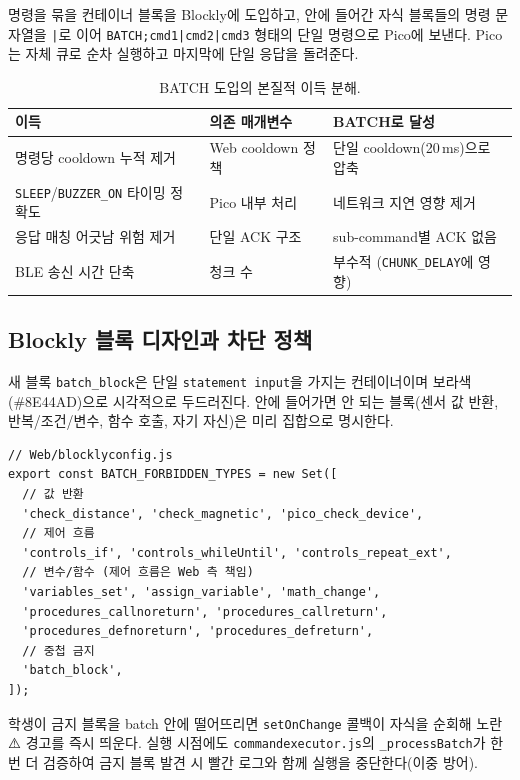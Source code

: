 \documentclass[11pt, oneside]{article}
\begin{document}
명령을 묶을 컨테이너 블록을 Blockly에 도입하고, 안에 들어간 자식 블록들의
명령 문자열을 \texttt{|}로 이어 \texttt{BATCH;cmd1|cmd2|cmd3} 형태의 단일
명령으로 Pico에 보낸다. Pico는 자체 큐로 순차 실행하고 마지막에 단일
응답을 돌려준다.

\begin{table}[h]
\centering
\small
\begin{tabularx}{\linewidth}{@{}lXX@{}}
\toprule
이득 & 의존 매개변수 & BATCH로 달성 \\
\midrule
명령당 cooldown 누적 제거 & Web cooldown 정책 & 단일 cooldown(20\,ms)으로 압축 \\
\texttt{SLEEP}/\texttt{BUZZER\_ON} 타이밍 정확도 & Pico 내부 처리 & 네트워크 지연 영향 제거 \\
응답 매칭 어긋남 위험 제거 & 단일 ACK 구조 & sub-command별 ACK 없음 \\
BLE 송신 시간 단축 & 청크 수 & 부수적 (\texttt{CHUNK\_DELAY}에 영향) \\
\bottomrule
\end{tabularx}
\caption{BATCH 도입의 본질적 이득 분해.}
\end{table}

\subsection{Blockly 블록 디자인과 차단 정책}

새 블록 \texttt{batch\_block}은 단일 \texttt{statement input}을 가지는
컨테이너이며 보라색(\#8E44AD)으로 시각적으로 두드러진다. 안에 들어가면
안 되는 블록(센서 값 반환, 반복/조건/변수, 함수 호출, 자기 자신)은
미리 집합으로 명시한다.

\begin{verbatim}
// Web/blocklyconfig.js
export const BATCH_FORBIDDEN_TYPES = new Set([
  // 값 반환
  'check_distance', 'check_magnetic', 'pico_check_device',
  // 제어 흐름
  'controls_if', 'controls_whileUntil', 'controls_repeat_ext',
  // 변수/함수 (제어 흐름은 Web 측 책임)
  'variables_set', 'assign_variable', 'math_change',
  'procedures_callnoreturn', 'procedures_callreturn',
  'procedures_defnoreturn', 'procedures_defreturn',
  // 중첩 금지
  'batch_block',
]);
\end{verbatim}

학생이 금지 블록을 batch 안에 떨어뜨리면 \texttt{setOnChange} 콜백이
자식을 순회해 노란 ⚠️ 경고를 즉시 띄운다. 실행 시점에도
\texttt{commandexecutor.js}의 \texttt{\_processBatch}가 한 번 더 검증하여
금지 블록 발견 시 빨간 로그와 함께 실행을 중단한다(이중 방어).
\end{document}

